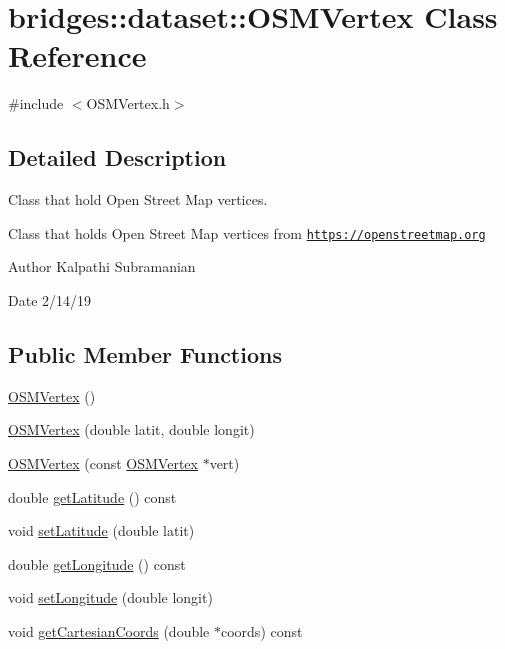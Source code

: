 \hypertarget{classbridges_1_1dataset_1_1_o_s_m_vertex}{}\section{bridges\+:\+:dataset\+:\+:O\+S\+M\+Vertex Class Reference}
\label{classbridges_1_1dataset_1_1_o_s_m_vertex}


{\ttfamily \#include $<$O\+S\+M\+Vertex.\+h$>$}



\subsection{Detailed Description}
Class that hold Open Street Map vertices. 

Class that holds Open Street Map vertices from \href{https://openstreetmap.org}{\tt https\+://openstreetmap.\+org}

\begin{DoxyAuthor}{Author}
Kalpathi Subramanian 
\end{DoxyAuthor}
\begin{DoxyDate}{Date}
2/14/19 
\end{DoxyDate}
\subsection*{Public Member Functions}
\begin{DoxyCompactItemize}
\item 
\hyperlink{classbridges_1_1dataset_1_1_o_s_m_vertex_aa5d6ef7aef3bb762665aa6ab3a2658f6}{O\+S\+M\+Vertex} ()
\item 
\hyperlink{classbridges_1_1dataset_1_1_o_s_m_vertex_adb462cf123d9fcfa31f98096650456b8}{O\+S\+M\+Vertex} (double latit, double longit)
\item 
\hyperlink{classbridges_1_1dataset_1_1_o_s_m_vertex_a0459f92f161c9e1d465c5142b947a704}{O\+S\+M\+Vertex} (const \hyperlink{classbridges_1_1dataset_1_1_o_s_m_vertex}{O\+S\+M\+Vertex} $\ast$vert)
\item 
double \hyperlink{classbridges_1_1dataset_1_1_o_s_m_vertex_a1f41a5f01d68747ee04b5c5eaa629c6e}{get\+Latitude} () const
\item 
void \hyperlink{classbridges_1_1dataset_1_1_o_s_m_vertex_af4ab2d69122919f504b78bd9540ccaa1}{set\+Latitude} (double latit)
\item 
double \hyperlink{classbridges_1_1dataset_1_1_o_s_m_vertex_a98e17875d886a63ed73a6f77cc26686d}{get\+Longitude} () const
\item 
void \hyperlink{classbridges_1_1dataset_1_1_o_s_m_vertex_a48e077133233ba705342ba955c6fdc23}{set\+Longitude} (double longit)
\item 
void \hyperlink{classbridges_1_1dataset_1_1_o_s_m_vertex_a0151ea438e8265b184a91c9591aa8a12}{get\+Cartesian\+Coords} (double $\ast$coords) const
\end{DoxyCompactItemize}


